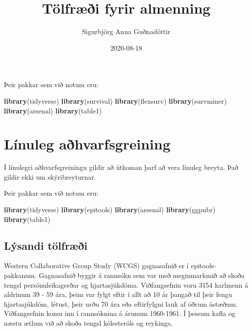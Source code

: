 \documentclass[
]{book}
\title{Tölfræði fyrir almenning}
\author{Sigurbjörg Anna Guðnadóttir}
\date{2020-08-18}
\newenvironment{Shaded}{\begin{snugshade}}{\end{snugshade}}
\newcommand{\KeywordTok}[1]{\textcolor[rgb]{0.13,0.29,0.53}{\textbf{#1}}}
\newcommand{\NormalTok}[1]{#1}
\begin{document}
\maketitle

{
\setcounter{tocdepth}{1}
\tableofcontents
}
Þeir pakkar sem við notum eru:

\begin{Shaded}
\begin{Highlighting}[]
\KeywordTok{library}\NormalTok{(tidyverse)}
\KeywordTok{library}\NormalTok{(survival)}
\KeywordTok{library}\NormalTok{(flexsurv)}
\KeywordTok{library}\NormalTok{(survminer)}
\KeywordTok{library}\NormalTok{(arsenal)}
\KeywordTok{library}\NormalTok{(table1)}
\end{Highlighting}
\end{Shaded}

\hypertarget{reg}{%
\chapter{Línuleg aðhvarfsgreining}\label{reg}}

Í línulegri aðhvarfsgreiningu gildir að útkoman þarf að vera línuleg breyta. Það gildir ekki um skýribreyturnar.

Þeir pakkar sem við notum eru:

\begin{Shaded}
\begin{Highlighting}[]
\KeywordTok{library}\NormalTok{(tidyverse)}
\KeywordTok{library}\NormalTok{(epitools)}
\KeywordTok{library}\NormalTok{(arsenal)}
\KeywordTok{library}\NormalTok{(ggpubr)}
\KeywordTok{library}\NormalTok{(table1)}
\end{Highlighting}
\end{Shaded}

\hypertarget{luxfdsandi-tuxf6lfruxe6uxf0i}{%
\section{Lýsandi tölfræði}\label{luxfdsandi-tuxf6lfruxe6uxf0i}}

Western Collaborative Group Study (WCGS) gagnasafnið er í epitools- pakkanum. Gagnasafnið byggir á rannsókn sem var með meginmarkmið að skoða tengsl persónuleikagerðar og hjartasjúkdóma. Viðfangsefnin voru 3154 karlmenn á aldrinum 39 - 59 ára, þeim var fylgt eftir í allt að 10 ár þangað til þeir fengu hjartasjúkdóm, létust, þeir urðu 70 ára eða eftirfylgni lauk af öðrum ástæðum. Viðfangsefnin komu inn í rannsóknina á árunum 1960-1961. Í þessum kafla og næstu ætlum við að skoða tengsl kólesteróls og reykinga.
\end{document}
